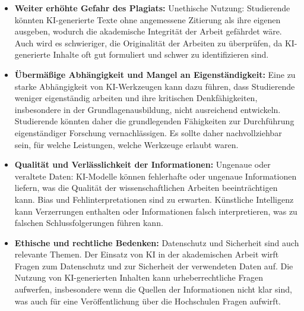 \documentclass[conference]{IEEEtran}
\begin{document}
\begin{itemize}[leftmargin=*]
    \item \textbf{Weiter erhöhte Gefahr des Plagiats:}
    \newline Unethische Nutzung: Studierende könnten KI-generierte Texte ohne angemessene Zitierung als ihre eigenen ausgeben, wodurch die akademische Integrität der Arbeit gefährdet wäre.
    \newline Auch wird es schwieriger, die Originalität der Arbeiten zu überprüfen, da KI-generierte Inhalte oft gut formuliert und schwer zu identifizieren sind.

    \item \textbf{Übermäßige Abhängigkeit und Mangel an Eigenständigkeit:}
    \newline Eine zu starke Abhängigkeit von KI-Werkzeugen kann dazu führen, dass Studierende weniger eigenständig arbeiten und ihre kritischen Denkfähigkeiten, insbesondere in der Grundlagenausbildung, nicht ausreichend entwickeln.
    \newline Studierende könnten daher die grundlegenden Fähigkeiten zur Durchführung eigenständiger Forschung vernachlässigen. Es sollte daher nachvollziehbar sein, für welche Leistungen, welche Werkzeuge erlaubt waren.

    \item \textbf{Qualität und Verlässlichkeit der Informationen:}
    \newline Ungenaue oder veraltete Daten: KI-Modelle können fehlerhafte oder ungenaue Informationen liefern, was die Qualität der wissenschaftlichen Arbeiten beeinträchtigen kann.
    \newline Bias und Fehlinterpretationen sind zu erwarten. Künstliche Intelligenz kann Verzerrungen enthalten oder Informationen falsch interpretieren, was zu falschen Schlussfolgerungen führen kann.

    \item \textbf{Ethische und rechtliche Bedenken:}
    \newline Datenschutz und Sicherheit sind auch relevante Themen. Der Einsatz von KI in der akademischen Arbeit wirft Fragen zum Datenschutz und zur Sicherheit der verwendeten Daten auf.
    \newline Die Nutzung von KI-generierten Inhalten kann urheberrechtliche Fragen aufwerfen, insbesondere wenn die Quellen der Informationen nicht klar sind, was auch für eine Veröffentlichung über die Hochschulen Fragen aufwirft.
\end{itemize}
\end{document}

